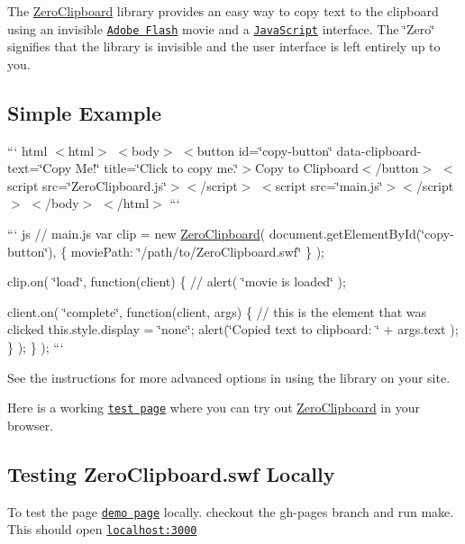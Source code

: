 The \hyperlink{class_zero_clipboard}{Zero\-Clipboard} library provides an easy way to copy text to the clipboard using an invisible \href{http://en.wikipedia.org/wiki/Adobe_Flash}{\tt Adobe Flash} movie and a \href{http://en.wikipedia.org/wiki/JavaScript}{\tt Java\-Script} interface. The \char`\"{}\-Zero\char`\"{} signifies that the library is invisible and the user interface is left entirely up to you.

\subsection*{Simple Example}

``` html $<$html$>$ $<$body$>$ $<$button id=\char`\"{}copy-\/button\char`\"{} data-\/clipboard-\/text=\char`\"{}\-Copy Me!\char`\"{} title=\char`\"{}\-Click to copy me.\char`\"{}$>$Copy to Clipboard$<$/button$>$ $<$script src=\char`\"{}\-Zero\-Clipboard.\-js\char`\"{}$>$$<$/script$>$ $<$script src=\char`\"{}main.\-js\char`\"{}$>$$<$/script$>$ $<$/body$>$ $<$/html$>$ ```

``` js // main.\-js var clip = new \hyperlink{class_zero_clipboard}{Zero\-Clipboard}( document.\-get\-Element\-By\-Id(\char`\"{}copy-\/button\char`\"{}), \{ movie\-Path\-: \char`\"{}/path/to/\-Zero\-Clipboard.\-swf\char`\"{} \} );

clip.\-on( \char`\"{}load\char`\"{}, function(client) \{ // alert( \char`\"{}movie is loaded\char`\"{} );

client.\-on( \char`\"{}complete\char`\"{}, function(client, args) \{ // {\ttfamily this} is the element that was clicked this.\-style.\-display = \char`\"{}none\char`\"{}; alert(\char`\"{}\-Copied text to clipboard\-: \char`\"{} + args.\-text ); \} ); \} ); ```

See the instructions for more advanced options in using the library on your site.

Here is a working \href{http://zeroclipboard.org/#demo}{\tt test page} where you can try out \hyperlink{class_zero_clipboard}{Zero\-Clipboard} in your browser.

\subsection*{Testing Zero\-Clipboard.\-swf Locally}

To test the page \href{http://zeroclipboard.org/#demo}{\tt demo page} locally. checkout the {\ttfamily gh-\/pages} branch and run {\ttfamily make}. This should open \href{http://localhost:3000/}{\tt localhost\-:3000}

